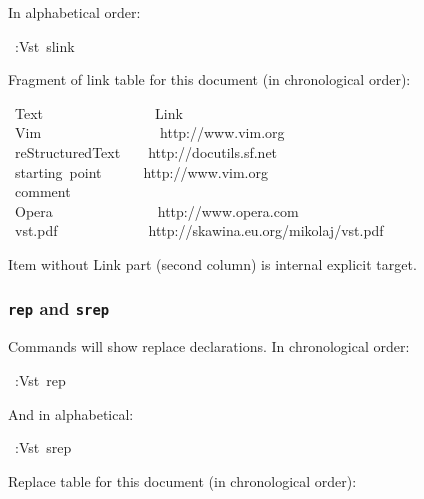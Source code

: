 \documentclass[12pt]{article}
\begin{document}
In alphabetical order:

\begin{ttfamily}\begin{flushleft}
\mbox{~:Vst~slink}\\
\end{flushleft}\end{ttfamily}

Fragment of link table for this document (in chronological order):

\begin{ttfamily}\begin{flushleft}
\mbox{~Text~~~~~~~~~~~~~~~~Link}\\
\mbox{~Vim~~~~~~~~~~~~~~~~~http://www.vim.org}\\
\mbox{~reStructuredText~~~~http://docutils.sf.net}\\
\mbox{~starting~point~~~~~~http://www.vim.org}\\
\mbox{~comment}\\
\mbox{~Opera~~~~~~~~~~~~~~~http://www.opera.com}\\
\mbox{~vst.pdf~~~~~~~~~~~~~http://skawina.eu.org/mikolaj/vst.pdf}\\
\end{flushleft}\end{ttfamily}

Item without Link part (second column) is internal explicit target.

\hypertarget{l9696rep9696-and-9696srep9696}{}
\subsubsection{\texttt{rep} and \texttt{srep}}

Commands will show replace declarations. In chronological order:

\begin{ttfamily}\begin{flushleft}
\mbox{~:Vst~rep}\\
\end{flushleft}\end{ttfamily}

And in alphabetical:

\begin{ttfamily}\begin{flushleft}
\mbox{~:Vst~srep}\\
\end{flushleft}\end{ttfamily}

Replace table for this document (in chronological order):
\end{document}
